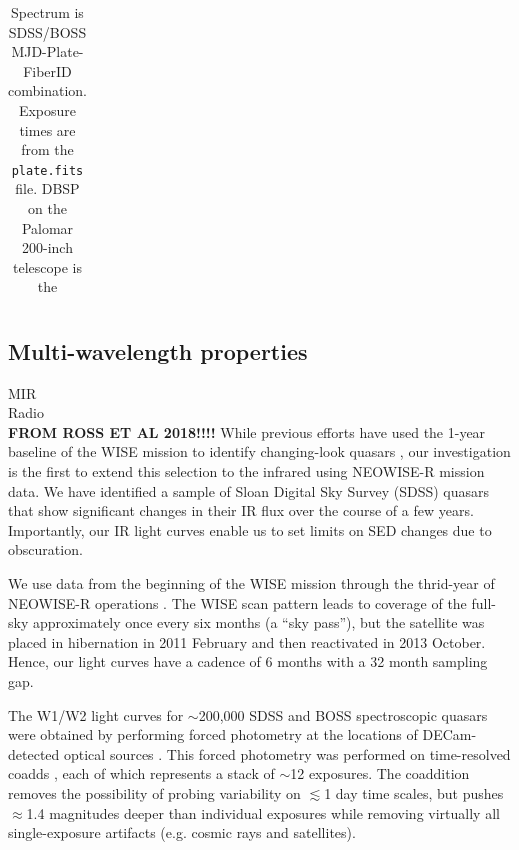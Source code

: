 \documentclass[a4paper,fleqn,usenatbib]{mnras}
\begin{document}
\begin{table}
\begin{tabular}{r  r  r r r   r r r r}
   \hline \hline   
  \end{tabular}
  \caption{Spectrum is SDSS/BOSS MJD-Plate-FiberID combination. 
Exposure times are from the {\tt plate.fits} file. 
DBSP on the Palomar 200-inch telescope is the } 
 \label{tab:obs_notes}
\end{table}



\subsection{Multi-wavelength properties}
MIR \\
Radio \\
{\bf FROM ROSS ET AL 2018!!!!} 
While previous efforts have used the 1-year baseline of the WISE mission to identify
changing-look quasars \citep[e.g.,][]{Assef2018, Stern2018}, our
investigation is the first to extend this selection to the infrared
using NEOWISE-R mission data. We have identified a sample of Sloan
Digital Sky Survey (SDSS) quasars that show significant changes in
their IR flux over the course of a few years. Importantly, our IR
light curves enable us to set limits on SED changes due to
obscuration.

We use data from the
beginning of the WISE mission \citep[2010 January; ][]{Wright2010}
through the thrid-year of NEOWISE-R operations \citep[2016 December;
][]{Mainzer2011}. The WISE scan pattern leads to coverage of the
full-sky approximately once every six months (a ``sky pass''), but the
satellite was placed in hibernation in 2011 February and then
reactivated in 2013 October. Hence, our light curves have a cadence of
6 months with a 32 month sampling gap.

The W1/W2 light curves for $\sim$200,000 SDSS and BOSS spectroscopic
quasars were obtained by performing forced photometry at the locations
of DECam-detected optical sources \citep{Lang2014, Meisner2017a,
Meisner2017b}. This forced photometry was performed on time-resolved
coadds \citep{Lang2014}, each of which represents a stack of $\sim$12
exposures. The coaddition removes the possibility of probing
variability on $\lesssim$1 day time scales, but pushes $\approx$1.4
magnitudes deeper than individual exposures while removing virtually
all single-exposure artifacts (e.g. cosmic rays and satellites).
\end{document}
